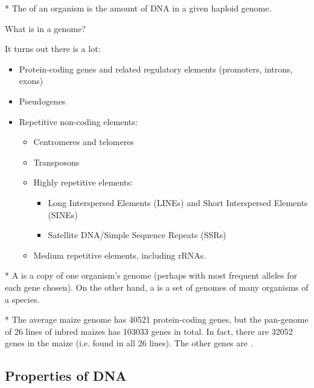 \begin{defn}*
	The  of an organism is the amount of DNA in a given haploid genome.
\end{defn}

\begin{que}
	What is in a genome?
\end{que}

It turns out there is a lot:

\begin{itemize}
	\item Protein-coding genes and related regulatory elements (promoters, introns, exons)
	\item Pseudogenes
	\item Repetitive non-coding elements:
		\begin{itemize}
			\item Centromeres and telomeres
			\item Transposons 
			\item Highly repetitive elements:
				\begin{itemize}
					\item Long Interspersed Elements (LINEs) and Short Interspersed Elements (SINEs)
					\item Satellite DNA/Simple Sequence Repeats (SSRs)
				\end{itemize}
			\item Medium repetitive elements, including rRNAs.
		\end{itemize}	
\end{itemize}

\begin{defn}*
	A  is a copy of one organism's genome (perhaps with most frequent alleles for each gene chosen).
	On the other hand, a  is a set of genomes of many organisms of a species.
\end{defn}

\begin{exm}*
	The average maize genome has 40521 protein-coding genes, but the pan-genome of 26 lines of inbred maizes has 103033 genes in total.
	In fact, there are 32052 genes in the maize  (i.e. found in all 26 lines). The other genes are .
\end{exm}

\subsection{Properties of DNA}

